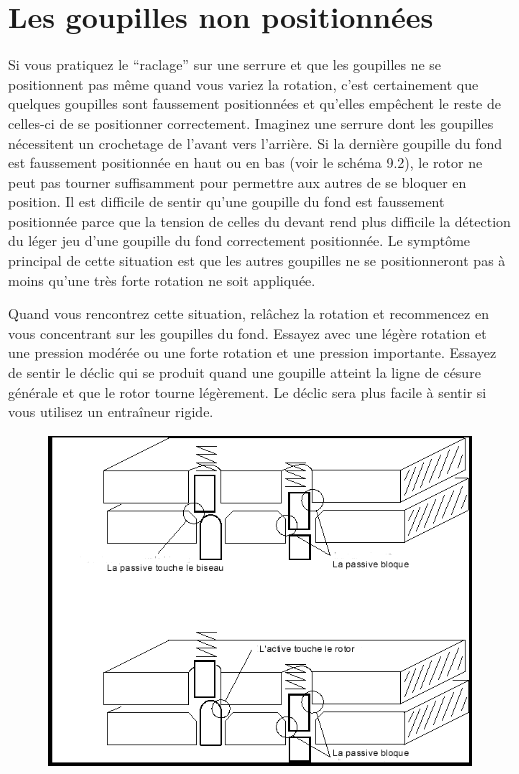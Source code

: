 \documentclass[a4paper,french,11pt,twoside]{report}
\begin{document}
\section{Les goupilles non positionnées}

Si vous pratiquez le \enquote{raclage} sur une serrure et que les goupilles ne se positionnent pas même quand vous variez la rotation, c'est certainement que quelques goupilles sont faussement positionnées et qu'elles empêchent le reste de celles-ci de se positionner correctement. Imaginez une serrure dont les goupilles nécessitent un crochetage de l'avant vers l'arrière. Si la dernière goupille du fond est faussement positionnée en haut ou en bas (voir le schéma 9.2), le rotor ne peut pas tourner suffisamment pour permettre aux autres de se bloquer en position. Il est difficile de sentir qu'une goupille du fond est faussement positionnée parce que la tension de celles du devant rend plus difficile la détection du léger jeu d'une goupille du fond correctement positionnée. Le symptôme principal de cette situation est que les autres goupilles ne se positionneront pas à moins qu'une très forte rotation ne soit appliquée.

Quand vous rencontrez cette situation, relâchez la rotation et recommencez en vous concentrant sur les goupilles du fond. Essayez avec une légère rotation et une pression modérée ou une forte rotation et une pression importante. Essayez de sentir le déclic qui se produit quand une goupille atteint la ligne de césure générale et que le rotor tourne légèrement. Le déclic sera plus facile à sentir si vous utilisez un entraîneur rigide.


\begin{figure}[h] \begin{center}
        \includegraphics[scale=0.6]{images/Image20}
        \caption{}
\end{center} \end{figure}
\end{document}
